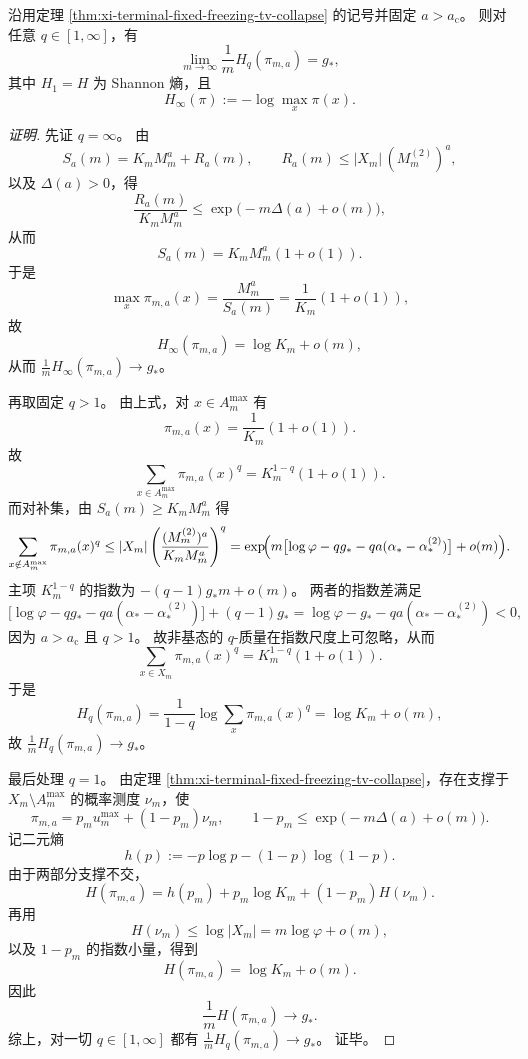 \begin{theorem}\label{thm:xi-terminal-fixed-freezing-renyi-collapse}
沿用定理 \ref{thm:xi-terminal-fixed-freezing-tv-collapse} 的记号并固定 \(a>a_{\mathrm c}\)。
则对任意 \(q\in[1,\infty]\)，有
\[
\lim_{m\to\infty}\frac{1}{m}H_q(\pi_{m,a})=g_*,
\]
其中 \(H_1=H\) 为 Shannon 熵，且
\[
H_\infty(\pi):=-\log\max_x\pi(x).
\]
\end{theorem}
\begin{proof}[证明]
先证 \(q=\infty\)。
由
\[
S_a(m)=K_mM_m^a+R_a(m),\qquad
R_a(m)\le |X_m|\,(M_m^{(2)})^a,
\]
以及 \(\Delta(a)>0\)，得
\[
\frac{R_a(m)}{K_mM_m^a}\le \exp\!\bigl(-m\Delta(a)+o(m)\bigr),
\]
从而
\[
S_a(m)=K_mM_m^a(1+o(1)).
\]
于是
\[
\max_x\pi_{m,a}(x)=\frac{M_m^a}{S_a(m)}=\frac{1}{K_m}(1+o(1)),
\]
故
\[
H_\infty(\pi_{m,a})=\log K_m+o(m),
\]
从而 \(\frac1mH_\infty(\pi_{m,a})\to g_*\)。

再取固定 \(q>1\)。
由上式，对 \(x\in A_m^{\max}\) 有
\[
\pi_{m,a}(x)=\frac{1}{K_m}(1+o(1)).
\]
故
\[
\sum_{x\in A_m^{\max}}\pi_{m,a}(x)^q
=
K_m^{1-q}(1+o(1)).
\]
而对补集，由 \(S_a(m)\ge K_mM_m^a\) 得
\[
\sum_{x\notin A_m^{\max}}\pi_{m,a}(x)^q
\le
|X_m|
\left(\frac{(M_m^{(2)})^a}{K_mM_m^a}\right)^q
=
\exp\!\Bigl(
m\bigl[\log\varphi-qg_*-qa(\alpha_*-\alpha_*^{(2)})\bigr]
+o(m)
\Bigr).
\]
主项 \(K_m^{1-q}\) 的指数为 \(-(q-1)g_*m+o(m)\)。
两者的指数差满足
\[
\bigl[\log\varphi-qg_*-qa(\alpha_*-\alpha_*^{(2)})\bigr]+(q-1)g_*
=
\log\varphi-g_*-qa(\alpha_*-\alpha_*^{(2)})<0,
\]
因为 \(a>a_{\mathrm c}\) 且 \(q>1\)。
故非基态的 \(q\)-质量在指数尺度上可忽略，从而
\[
\sum_{x\in X_m}\pi_{m,a}(x)^q
=
K_m^{1-q}(1+o(1)).
\]
于是
\[
H_q(\pi_{m,a})
=
\frac{1}{1-q}\log\sum_x\pi_{m,a}(x)^q
=
\log K_m+o(m),
\]
故 \(\frac1mH_q(\pi_{m,a})\to g_*\)。

最后处理 \(q=1\)。
由定理 \ref{thm:xi-terminal-fixed-freezing-tv-collapse}，存在支撑于 \(X_m\setminus A_m^{\max}\) 的概率测度 \(\nu_m\)，使
\[
\pi_{m,a}=p_m u_m^{\max}+(1-p_m)\nu_m,
\qquad
1-p_m\le \exp\!\bigl(-m\Delta(a)+o(m)\bigr).
\]
记二元熵
\[
h(p):=-p\log p-(1-p)\log(1-p).
\]
由于两部分支撑不交，
\[
H(\pi_{m,a})=h(p_m)+p_m\log K_m+(1-p_m)H(\nu_m).
\]
再用
\[
H(\nu_m)\le \log|X_m|=m\log\varphi+o(m),
\]
以及 \(1-p_m\) 的指数小量，得到
\[
H(\pi_{m,a})=\log K_m+o(m).
\]
因此
\[
\frac{1}{m}H(\pi_{m,a})\to g_*.
\]
综上，对一切 \(q\in[1,\infty]\) 都有 \(\frac1mH_q(\pi_{m,a})\to g_*\)。
证毕。
\end{proof}

